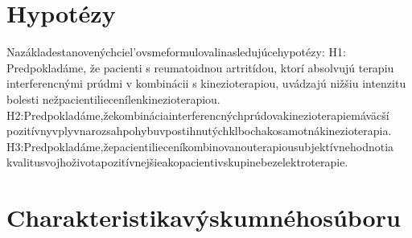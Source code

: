\section{Hypotézy}

Nazákladestanovenýchciel’ovsmeformulovalinasledujúcehypotézy: H1: Predpokladáme, že pacienti s reumatoidnou artritídou, ktorí absolvujú terapiu interferencnými prúdmi v kombinácii s kinezioterapiou, uvádzajú nižšiu intenzitu bolesti nežpacientiliecenílenkinezioterapiou. H2:Predpokladáme,žekombináciainterferencnýchprúdovakinezioterapiemáväcší pozitívnyvplyvnarozsahpohybuvpostihnutýchklbochakosamotnákinezioterapia. H3:Predpokladáme,žepacientilieceníkombinovanouterapiousubjektívnehodnotia kvalitusvojhoživotapozitívnejšieakopacientivskupinebezelektroterapie.


\section{Charakteristikavýskumnéhosúboru}

